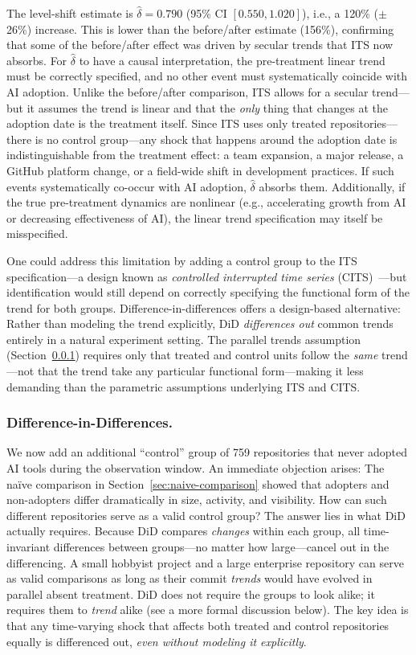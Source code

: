 The level-shift estimate is $\hat{\delta} = 0.790$ (95\% CI $[0.550, 1.020]$), i.e., a 120\% ($\pm$26\%) increase.
This is lower than the before/after estimate (156\%), confirming that some of the before/after effect was driven by secular trends that ITS now absorbs.
For $\hat{\delta}$ to have a causal interpretation, the pre-treatment linear trend must be correctly specified, and no other event must systematically coincide with AI adoption.
Unlike the before/after comparison, ITS allows for a secular trend---but it assumes the trend is linear and that the \emph{only} thing that changes at the adoption date is the treatment itself.
Since ITS uses only treated repositories---there is no control group---any shock that happens around the adoption date is indistinguishable from the treatment effect: a team expansion, a major release, a GitHub platform change, or a field-wide shift in development practices.
If such events systematically co-occur with AI adoption, $\hat{\delta}$ absorbs them.
Additionally, if the true pre-treatment dynamics are nonlinear (e.g., accelerating growth from AI or decreasing effectiveness of AI), the linear trend specification may itself be misspecified.

One could address this limitation by adding a control group to the ITS specification---a design known as \emph{controlled interrupted time series} (CITS)~\cite{bernal2017interrupted}---but identification would still depend on correctly specifying the functional form of the trend for both groups.
Difference-in-differences offers a design-based alternative: Rather than modeling the trend explicitly, DiD \emph{differences out} common trends entirely in a natural experiment setting.
The parallel trends assumption (Section~\ref{sec:did}) requires only that treated and control units follow the \emph{same} trend---not that the trend take any particular functional form---making it less demanding than the parametric assumptions underlying ITS and CITS.

\subsubsection{Difference-in-Differences.}
\label{sec:did}

We now add an additional ``control'' group of 759 repositories that never adopted AI tools during the observation window.
An immediate objection arises: The na\"ive comparison in Section~\ref{sec:naive-comparison} showed that adopters and non-adopters differ dramatically in size, activity, and visibility.
How can such different repositories serve as a valid control group?
The answer lies in what DiD actually requires.
Because DiD compares \emph{changes} within each group, all time-invariant differences between groups---no matter how large---cancel out in the differencing.
A small hobbyist project and a large enterprise repository can serve as valid comparisons as long as their commit \emph{trends} would have evolved in parallel absent treatment.
DiD does not require the groups to look alike; it requires them to \emph{trend} alike (see a more formal discussion below).
The key idea is that any time-varying shock that affects both treated and control repositories equally is differenced out, \emph{even without modeling it explicitly}.

